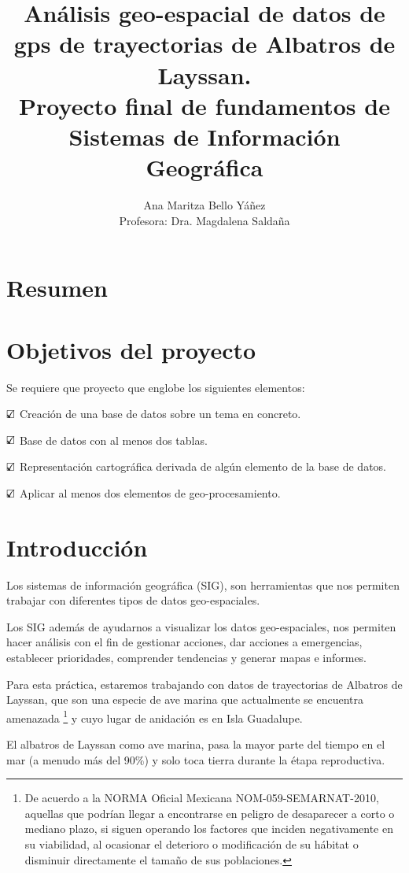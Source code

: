 \documentclass[a4paper, 11pt]{article}
\title{ Análisis geo-espacial de datos de gps de trayectorias de Albatros de
Layssan. \\
Proyecto final de fundamentos de Sistemas de Información Geográfica \\
}
\author{Ana Maritza Bello Yáñez \\ Profesora: Dra. Magdalena Saldaña}
\begin{document}
\maketitle
\tableofcontents

\section{Resumen}

\section{Objetivos del proyecto}

Se requiere que proyecto que englobe los siguientes elementos:

$\text{\rlap{$\checkmark$}}\square$ Creación de una base de datos sobre un tema
en concreto.

$\text{\rlap{$\checkmark$}}\square$ Base de datos con al menos dos tablas.

$\text{\rlap{$\checkmark$}}\square$ Representación cartográfica derivada de
algún elemento de la base de datos.

$\text{\rlap{$\checkmark$}}\square$ Aplicar al menos dos elementos de
geo-procesamiento.


\section{Introducción}

Los sistemas de información geográfica (SIG), son herramientas que nos permiten
trabajar con diferentes tipos de datos geo-espaciales.

Los SIG además de ayudarnos a visualizar los datos geo-espaciales, nos permiten
hacer análisis con el fin de gestionar acciones, dar acciones a emergencias,
establecer prioridades, comprender tendencias y generar mapas e informes.

Para esta práctica, estaremos trabajando con datos de trayectorias de Albatros
de Layssan, que son una especie de ave marina que actualmente se encuentra
amenazada \footnote{De acuerdo a la NORMA Oficial Mexicana
NOM-059-SEMARNAT-2010, aquellas que podrían llegar a encontrarse en peligro de
desaparecer a corto o mediano plazo, si siguen operando los factores que inciden
negativamente en su viabilidad, al ocasionar el deterioro o modificación de su
hábitat o disminuir directamente el tamaño de sus poblaciones.} y cuyo lugar de
anidación es en Isla Guadalupe.

El albatros de Layssan como ave marina, pasa la mayor parte del tiempo en el mar
(a menudo más del 90\%) y solo toca tierra durante la étapa reproductiva.
\end{document}

